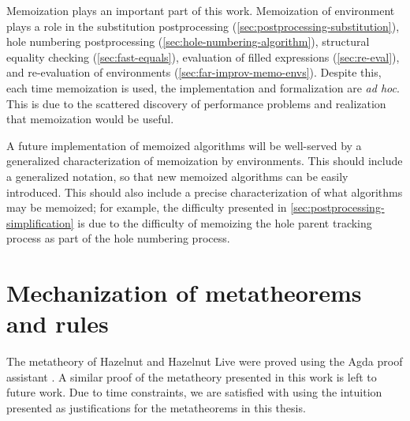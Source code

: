 Memoization plays an important part of this work. Memoization of environment plays a role in the substitution postprocessing (\cref{sec:postprocessing-substitution}), hole numbering postprocessing (\cref{sec:hole-numbering-algorithm}), structural equality checking (\cref{sec:fast-equals}), evaluation of filled expressions (\cref{sec:re-eval}), and re-evaluation of environments (\cref{sec:far-improv-memo-envs}). Despite this, each time memoization is used, the implementation and formalization are \textit{ad hoc}. This is due to the scattered discovery of performance problems and realization that memoization would be useful.

A future implementation of memoized algorithms will be well-served by a generalized characterization of memoization by environments. This should include a generalized notation, so that new memoized algorithms can be easily introduced. This should also include a precise characterization of what algorithms may be memoized; for example, the difficulty presented in \cref{sec:postprocessing-simplification} is due to the difficulty of memoizing the hole parent tracking process as part of the hole numbering process.

\section{Mechanization of metatheorems and rules}
\label{sec:formalization}

The metatheory of Hazelnut and Hazelnut Live were proved using the Agda proof assistant \cite{agda2017_git,agda2019_git}. A similar proof of the metatheory presented in this work is left to future work. Due to time constraints, we are satisfied with using the intuition presented as justifications for the metatheorems in this thesis.

